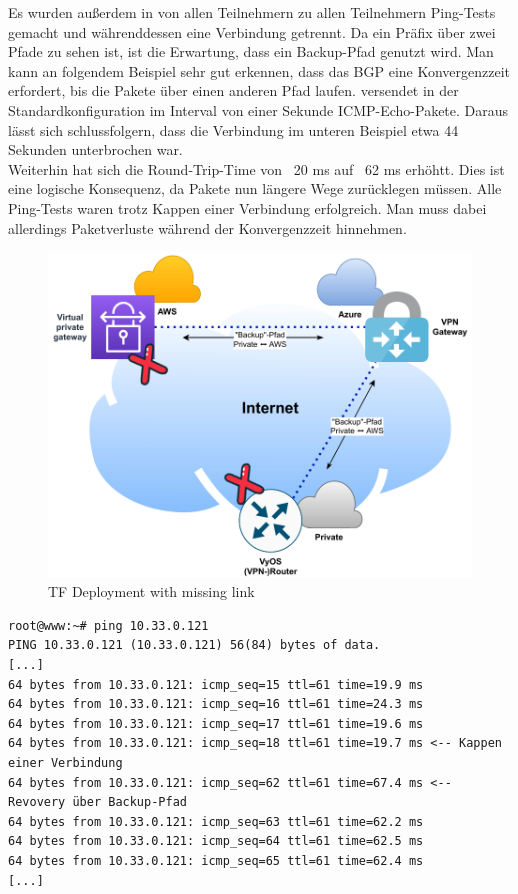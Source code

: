 
Es wurden außerdem in von allen Teilnehmern zu allen Teilnehmern Ping-Tests gemacht und währenddessen eine Verbindung getrennt. Da ein Präfix über zwei Pfade zu sehen ist, ist die Erwartung, dass ein Backup-Pfad genutzt wird. Man kann an folgendem Beispiel sehr gut erkennen, dass das BGP eine Konvergenzzeit erfordert, bis die Pakete über einen anderen Pfad laufen.  versendet in der Standardkonfiguration im Interval von einer Sekunde ICMP-Echo-Pakete. Daraus lässt sich schlussfolgern, dass die Verbindung im unteren Beispiel etwa 44 Sekunden unterbrochen war.\\
Weiterhin hat sich die Round-Trip-Time von ~20 ms auf ~62 ms erhöhtt. Dies ist eine logische Konsequenz, da Pakete nun längere Wege zurücklegen müssen. Alle Ping-Tests waren trotz Kappen einer Verbindung erfolgreich. Man muss dabei allerdings Paketverluste während der Konvergenzzeit hinnehmen.

\begin{figure}[h]
  \centering
  \includegraphics{Figures/Use-Case-1_Basis_Deployment_missing_link.pdf}
  \caption{TF Deployment with missing link}
  \label{grafik:Use-Case-1_Basis_Deployment_missing_link}
\end{figure}

\begin{lstlisting}[label=tf-base-deployment-ping-ok,caption=Ping Tests zwischen verschiedenen Cloud-Plattformen mit Kappen einer Backbone-Verbindung.]
root@www:~# ping 10.33.0.121
PING 10.33.0.121 (10.33.0.121) 56(84) bytes of data.
[...]
64 bytes from 10.33.0.121: icmp_seq=15 ttl=61 time=19.9 ms
64 bytes from 10.33.0.121: icmp_seq=16 ttl=61 time=24.3 ms
64 bytes from 10.33.0.121: icmp_seq=17 ttl=61 time=19.6 ms
64 bytes from 10.33.0.121: icmp_seq=18 ttl=61 time=19.7 ms <-- Kappen einer Verbindung
64 bytes from 10.33.0.121: icmp_seq=62 ttl=61 time=67.4 ms <-- Revovery über Backup-Pfad
64 bytes from 10.33.0.121: icmp_seq=63 ttl=61 time=62.2 ms
64 bytes from 10.33.0.121: icmp_seq=64 ttl=61 time=62.5 ms
64 bytes from 10.33.0.121: icmp_seq=65 ttl=61 time=62.4 ms
[...]
\end{lstlisting}

